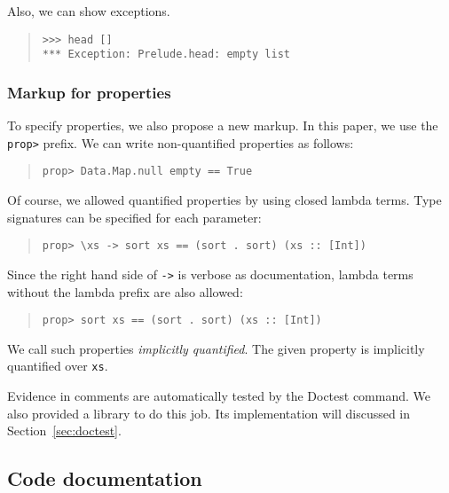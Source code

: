 \documentclass[preprint]{sigplanconf}
\begin{document}
\noindent Also, we can show exceptions.

\begin{quote}
\small
\begin{verbatim}
>>> head []
*** Exception: Prelude.head: empty list
\end{verbatim}
\end{quote}

\subsubsection{Markup for properties}

\noindent To specify properties, we also propose a new markup. In this paper, we
use the {\tt prop>} prefix. We can write non-quantified properties as follows:

\begin{quote}
\small
\begin{verbatim}
prop> Data.Map.null empty == True
\end{verbatim}
\end{quote}

\noindent Of course, we allowed quantified properties by using closed
lambda terms.
Type signatures can be specified for each parameter:

\begin{quote}
\small
\begin{verbatim}
prop> \xs -> sort xs == (sort . sort) (xs :: [Int])
\end{verbatim}
\end{quote}

\noindent Since the right hand side of {\tt ->} is verbose as documentation,
lambda terms without the lambda prefix are also allowed:

\begin{quote}
\small
\begin{verbatim}
prop> sort xs == (sort . sort) (xs :: [Int])
\end{verbatim}
\end{quote}

\noindent We call such properties \emph{implicitly quantified}.  The
given property is implicitly quantified over \verb|xs|.

Evidence in comments are automatically
tested by the Doctest command. We also provided a library
to do this job. Its implementation will discussed in Section~\ref{sec:doctest}.

\subsection{Code documentation}
\label{sec:code-doc}
\end{document}
